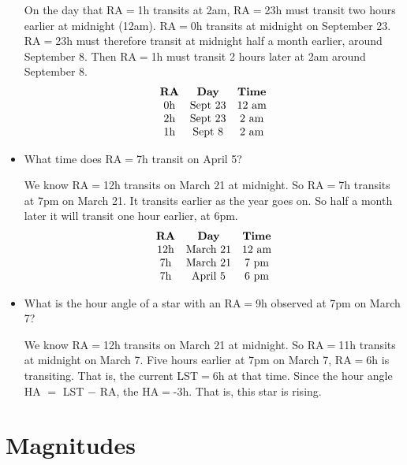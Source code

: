 \documentclass[12pt, preprint]{aastex}
\begin{document}
\begin{itemize}
  \begin{answer}
    On the day that RA$=$1h transits at 2am, RA$=$23h must transit two
    hours earlier at midnight (12am). RA$=$0h transits at midnight on
    September 23. RA$=$23h must therefore transit at midnight half a
    month earlier, around September 8. Then RA$=$1h must transit 2
    hours later at 2am around September 8.
    \begin{equation}
    \begin{array}{ccc}
      \mbox{\bf RA} & \mbox{\bf Day} & \mbox{\bf Time} \cr
      \mbox{0h} & \mbox{Sept 23} & \mbox{12 am}\cr
      \mbox{2h} & \mbox{Sept 23}  & \mbox{2 am}\cr
      \mbox{1h} & \mbox{Sept 8}  & \mbox{2 am}\cr
    \end{array}
    \end{equation}
  \end{answer}
\item What time does RA$=$7h transit on April 5?

  \begin{answer}
    We know RA$=$12h transits on March 21 at midnight. So RA$=$7h
    transits at 7pm on March 21. It transits
    earlier as the year goes on. So half a month later it will transit
    one hour earlier, at 6pm. 
    \begin{equation}
    \begin{array}{ccc}
      \mbox{\bf RA} & \mbox{\bf Day} & \mbox{\bf Time} \cr
      \mbox{12h} & \mbox{March 21} & \mbox{12 am}\cr
      \mbox{7h} & \mbox{March 21}  & \mbox{7 pm}\cr
      \mbox{7h} & \mbox{April 5}  & \mbox{6 pm}\cr
    \end{array}
    \end{equation}
  \end{answer}
\item What is the hour angle of a star with an RA$=$9h observed at
  7pm on March 7?

  \begin{answer}
    We know RA$=$12h transits on March 21 at midnight. So RA$=$11h
    transits at midnight on March 7. Five hours earlier at 7pm on
    March 7, RA$=$6h is transiting. That is, the current LST$=$6h at
    that time. Since the hour angle HA $=$ LST $-$ RA, the
    HA$=$-3h. That is, this star is rising.
  \end{answer}
\end{itemize}

\section{Magnitudes}
\end{document}
